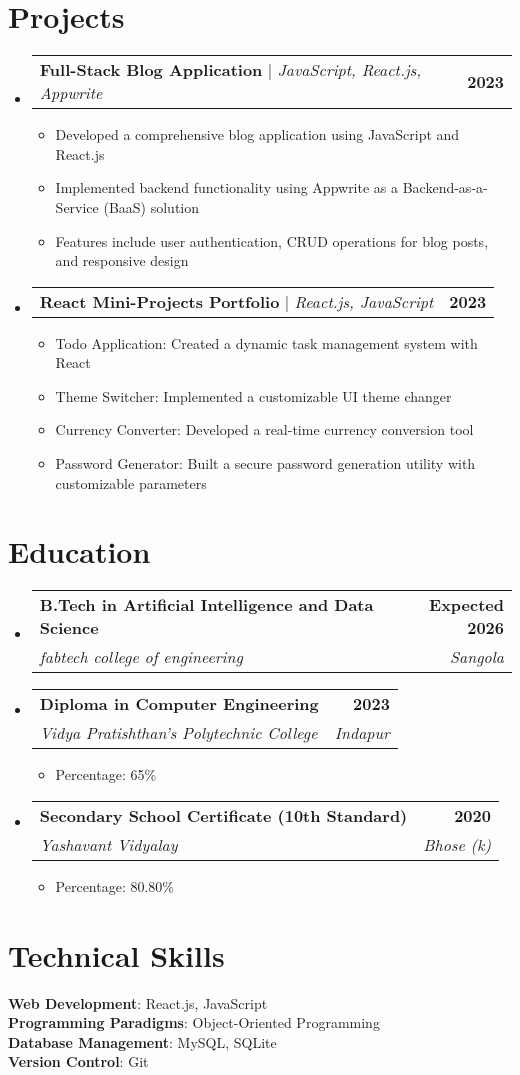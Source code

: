 \documentclass[a4paper,11pt]{article}
\makeatletter
\newcommand{\resumeItem}[1]{
  \item\small{
    {#1 \vspace{-2pt}}
  }
}
\newcommand{\resumeSubheading}[4]{
  \vspace{-2pt}\item
    \begin{tabular*}{1.0\textwidth}[t]{l@{\extracolsep{\fill}}r}
      \textbf{#1} & \textbf{\small #2} \\
      \textit{\small#3} & \textit{\small #4} \\
    \end{tabular*}\vspace{-7pt}
}
\newcommand{\resumeProjectHeading}[2]{
    \item
    \begin{tabular*}{1.001\textwidth}{l@{\extracolsep{\fill}}r}
      \small#1 & \textbf{\small #2}\\
    \end{tabular*}\vspace{-7pt}
}
\newcommand{\resumeSubHeadingListStart}{\begin{itemize}[leftmargin=0.0in, label={}]}
\newcommand{\resumeSubHeadingListEnd}{\end{itemize}}
\newcommand{\resumeItemListStart}{\begin{itemize}}
\newcommand{\resumeItemListEnd}{\end{itemize}\vspace{-5pt}}
\makeatother
\begin{document}
\section{Projects}
\resumeSubHeadingListStart
    \resumeProjectHeading
    {\textbf{Full-Stack Blog Application} $|$ \emph{JavaScript, React.js, Appwrite}}{2023}
    \resumeItemListStart
        \resumeItem{Developed a comprehensive blog application using JavaScript and React.js}
        \resumeItem{Implemented backend functionality using Appwrite as a Backend-as-a-Service (BaaS) solution}
        \resumeItem{Features include user authentication, CRUD operations for blog posts, and responsive design}
    \resumeItemListEnd
    \resumeProjectHeading
    {\textbf{React Mini-Projects Portfolio} $|$ \emph{React.js, JavaScript}}{2023}
    \resumeItemListStart
        \resumeItem{Todo Application: Created a dynamic task management system with React}
        \resumeItem{Theme Switcher: Implemented a customizable UI theme changer}
        \resumeItem{Currency Converter: Developed a real-time currency conversion tool}
        \resumeItem{Password Generator: Built a secure password generation utility with customizable parameters}
    \resumeItemListEnd
\resumeSubHeadingListEnd

\section{Education}
\resumeSubHeadingListStart
    \resumeSubheading
    {B.Tech in Artificial Intelligence and Data Science}{Expected 2026}
    {fabtech college of engineering}{Sangola}
    \resumeSubheading
    {Diploma in Computer Engineering}{2023}
    {Vidya Pratishthan's Polytechnic College}{Indapur}
    \resumeItemListStart
        \resumeItem{Percentage: 65\%}
    \resumeItemListEnd
    \resumeSubheading
    {Secondary School Certificate (10th Standard)}{2020}
    {Yashavant Vidyalay}{Bhose (k)}
    \resumeItemListStart
        \resumeItem{Percentage: 80.80\%}
    \resumeItemListEnd
\resumeSubHeadingListEnd

\section{Technical Skills}
\begin{itemize}[leftmargin=0.15in, label={}]
    \small{\item{
    \textbf{Web Development}{: React.js, JavaScript} \\
    \textbf{Programming Paradigms}{: Object-Oriented Programming} \\
    \textbf{Database Management}{: MySQL, SQLite} \\
    \textbf{Version Control}{: Git}
    }}
\end{itemize}
\end{document}
